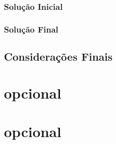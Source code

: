 \documentclass[a4paper,openright, oneside, article, 12pt, brazil]{abntex2}
\begin{document}
\subsection{Solução Inicial}


\subsection{Solução Final}


\newpage
\section{Considerações Finais}



\newpage
\postextual

\printbibliography

\anexos

\newpage
\chapter{opcional}


\apendices

\newpage
\chapter{opcional}

\end{document}
